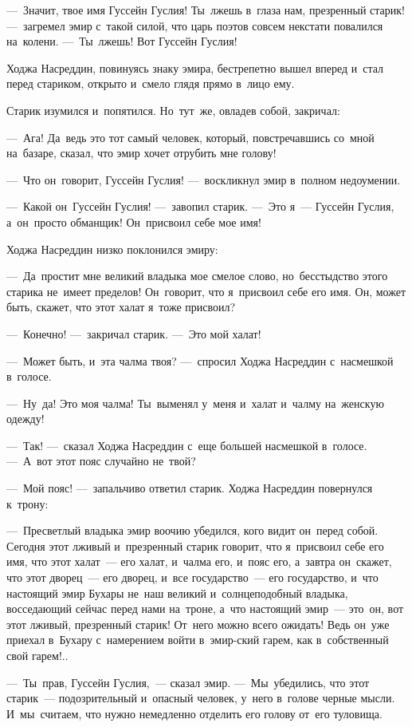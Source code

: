 \documentclass[12pt,a4paper]{book}
\begin{document}
—~Значит, твое имя Гуссейн Гуслия! Ты~лжешь в~глаза нам, презренный старик! —~загремел эмир с~такой силой, что царь поэтов совсем некстати повалился на~колени. —~Ты~лжешь! Вот Гуссейн Гуслия!

Ходжа Насреддин, повинуясь знаку эмира, бестрепетно вышел вперед и~стал перед стариком, открыто и~смело глядя прямо в~лицо ему.

Старик изумился и~попятился. Но~тут~же, овладев собой, закричал:

—~Ага! Да~ведь это тот самый человек, который, повстречавшись со~мной на~базаре, сказал, что эмир хочет отрубить мне голову!

—~Что он~говорит, Гуссейн Гуслия! —~воскликнул эмир в~полном недоумении.

—~Какой он~Гуссейн Гуслия! —~завопил старик. —~Это я~— Гуссейн Гуслия, а~он~просто обманщик! Он~присвоил себе мое имя!

Ходжа Насреддин низко поклонился эмиру:

—~Да~простит мне великий владыка мое смелое слово, но~бесстыдство этого старика не~имеет пределов! Он~говорит, что я~присвоил себе его имя. Он, может быть, скажет, что этот халат я~тоже присвоил?

—~Конечно! —~закричал старик. —~Это мой халат!

—~Может быть, и~эта чалма твоя? —~спросил Ходжа Насреддин с~насмешкой в~голосе.

—~Ну~да! Это моя чалма! Ты~выменял у~меня и~халат и~чалму на~женскую одежду!

—~Так! —~сказал Ходжа Насреддин с~еще большей насмешкой в~голосе. —~А~вот этот пояс случайно не~твой?

—~Мой пояс! —~запальчиво ответил старик. Ходжа Насреддин повернулся к~трону:

—~Пресветлый владыка эмир воочию убедился, кого видит он~перед собой. Сегодня этот лживый и~презренный старик говорит, что я~присвоил себе его имя, что этот халат~— его халат, и~чалма его, и~пояс его, а~завтра он~скажет, что этот дворец~— его дворец, и~все государство~— его государство, и~что настоящий эмир Бухары не~наш великий и~солнцеподобный владыка, восседающий сейчас перед нами на~троне, а~что настоящий эмир~— это~он, вот этот лживый, презренный старик! От~него можно всего ожидать! Ведь он~уже приехал в~Бухару с~намерением войти в~эмир-ский гарем, как в~собственный свой гарем!..

—~Ты~прав, Гуссейн Гуслия,~— сказал эмир. —~Мы~убедились, что этот старик~— подозрительный и~опасный человек, у~него в~голове черные мысли. И~мы~считаем, что нужно немедленно отделить его голову от~его туловища.
\end{document}
